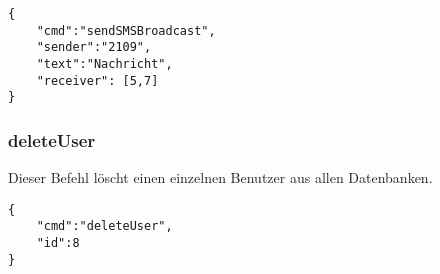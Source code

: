 \begin{lstlisting}[style=json]
{
	"cmd":"sendSMSBroadcast",
	"sender":"2109",
	"text":"Nachricht",
	"receiver": [5,7]
}
\end{lstlisting}

\subsubsection*{deleteUser}

Dieser Befehl löscht einen einzelnen Benutzer aus allen Datenbanken.

\begin{lstlisting}[style=json]
{
	"cmd":"deleteUser",
	"id":8
}
\end{lstlisting}